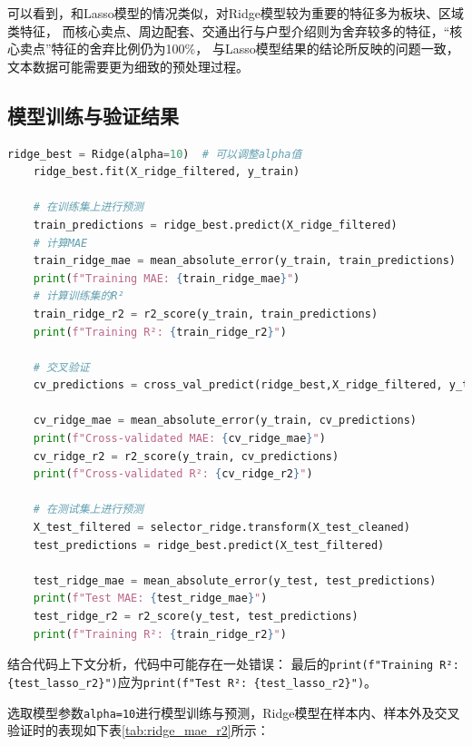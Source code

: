 \documentclass[
    report,     %
    oneside,    %
    UTF8,       %
    zihao=-4    %
]{config} %
\begin{document}
可以看到，和Lasso模型的情况类似，对Ridge模型较为重要的特征多为板块、区域类特征，
而核心卖点、周边配套、交通出行与户型介绍则为舍弃较多的特征，“核心卖点”特征的舍弃比例仍为100\%，
与Lasso模型结果的结论所反映的问题一致，文本数据可能需要更为细致的预处理过程。

\subsection{模型训练与验证结果}
\begin{lstlisting}[label=code:ridge_model, language=Python, caption=Ridge模型训练]
    ridge_best = Ridge(alpha=10)  # 可以调整alpha值  
    ridge_best.fit(X_ridge_filtered, y_train)  

    # 在训练集上进行预测  
    train_predictions = ridge_best.predict(X_ridge_filtered) 
    # 计算MAE
    train_ridge_mae = mean_absolute_error(y_train, train_predictions)  
    print(f"Training MAE: {train_ridge_mae}")  
    # 计算训练集的R²  
    train_ridge_r2 = r2_score(y_train, train_predictions)  
    print(f"Training R²: {train_ridge_r2}")

    # 交叉验证
    cv_predictions = cross_val_predict(ridge_best,X_ridge_filtered, y_train, cv=6)  

    cv_ridge_mae = mean_absolute_error(y_train, cv_predictions)  
    print(f"Cross-validated MAE: {cv_ridge_mae}")   
    cv_ridge_r2 = r2_score(y_train, cv_predictions)  
    print(f"Cross-validated R²: {cv_ridge_r2}")

    # 在测试集上进行预测
    X_test_filtered = selector_ridge.transform(X_test_cleaned) 
    test_predictions = ridge_best.predict(X_test_filtered)  

    test_ridge_mae = mean_absolute_error(y_test, test_predictions)  
    print(f"Test MAE: {test_ridge_mae}") 
    test_ridge_r2 = r2_score(y_test, test_predictions)  
    print(f"Training R²: {train_ridge_r2}")
\end{lstlisting}

结合代码上下文分析，代码中可能存在一处错误：
最后的\lstinline|print(f"Training R²: {test_lasso_r2}")|应为\lstinline|print(f"Test R²: {test_lasso_r2}")|。

选取模型参数\lstinline|alpha=10|进行模型训练与预测，Ridge模型在样本内、样本外及交叉验证时的表现如下表\ref{tab:ridge_mae_r2}所示：
\begin{table}[htbp]
    \centering
    \caption{Ridge模型在样本内、样本外及交叉验证时的表现}
    \label{tab:ridge_mae_r2}
\end{table}
\end{document}
